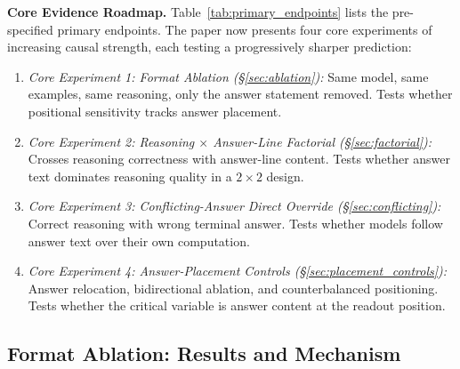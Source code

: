 \documentclass{article}
\theoremstyle{definition}
\theoremstyle{definition}
\begin{document}
\bigskip
\noindent\textbf{Core Evidence Roadmap.}
Table~\ref{tab:primary_endpoints} lists the pre-specified primary endpoints.
The paper now presents four core experiments of increasing causal strength,
each testing a progressively sharper prediction:
\begin{enumerate}[nosep]
  \item \emph{Core Experiment 1: Format Ablation (\S\ref{sec:ablation}):} Same model, same
    examples, same reasoning, only the answer statement removed. Tests whether
    positional sensitivity tracks answer placement.
  \item \emph{Core Experiment 2: Reasoning $\times$ Answer-Line Factorial (\S\ref{sec:factorial}):}
    Crosses reasoning correctness with answer-line content. Tests whether answer
    text dominates reasoning quality in a $2\times2$ design.
  \item \emph{Core Experiment 3: Conflicting-Answer Direct Override (\S\ref{sec:conflicting}):}
    Correct reasoning with wrong terminal answer. Tests whether models follow
    answer text over their own computation.
  \item \emph{Core Experiment 4: Answer-Placement Controls (\S\ref{sec:placement_controls}):}
    Answer relocation, bidirectional ablation, and counterbalanced positioning.
    Tests whether the critical variable is answer content at the readout position.
\end{enumerate}
\bigskip

\subsection{Format Ablation: Results and Mechanism}
\label{sec:ablation_results}
\end{document}
